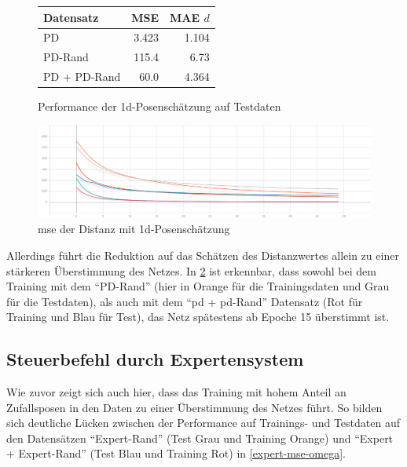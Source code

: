\begin{figure}[H]
	\centering
	\begin{tabular}[t]{|l|r|r|}
		\hline
		Datensatz & MSE & MAE $d$ \\
		\hline
		PD & 3.423 & 1.104 \\
		\hline
		PD-Rand & 115.4 & 6.73 \\
		\hline
		PD + PD-Rand & 60.0 & 4.364 \\
		\hline
	\end{tabular}
	\caption{Performance der \acs{1d}-Posenschätzung auf Testdaten}
	\label{1d-pose-performance}
\end{figure}

\begin{figure}[H]
	\centering
	\includegraphics[width=\linewidth]{kapitel5/images/tensorboard/d-only/Loss-d-only.png}
	\caption{\acs{mse} der Distanz mit \acs{1d}-Posenschätzung}
	\label{1d-poses-mse-d}
\end{figure}

Allerdings führt die Reduktion auf das Schätzen des Distanzwertes allein zu einer stärkeren Überstimmung des Netzes. In \ref{1d-poses-mse-d} ist erkennbar, dass sowohl bei dem Training mit dem ``PD-Rand'' (hier in Orange für die Trainingsdaten und Grau für die Testdaten), als auch mit dem ``\acs{pd} + \acs{pd}-Rand'' Datensatz (Rot für Training und Blau für Test), das Netz spätestens ab Epoche 15 überstimmt ist.

\subsection{Steuerbefehl durch Expertensystem}


Wie zuvor zeigt sich auch hier, dass das Training mit hohem Anteil an Zufallsposen in den Daten zu einer Überstimmung des Netzes führt. So bilden sich deutliche Lücken zwischen der Performance auf Trainings- und Testdaten auf den Datensätzen ``Expert-Rand'' (Test Grau und Training Orange) und ``Expert + Expert-Rand'' (Test Blau und Training Rot) in \ref{expert-mse-omega}.


